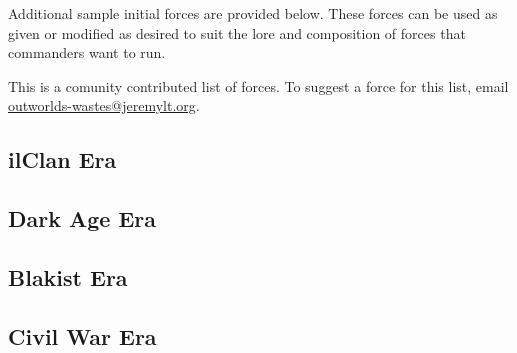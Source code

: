 Additional sample initial forces are provided below.
These forces can be used as given or modified as desired to suit the lore and composition of forces that commanders want to run.

This is a comunity contributed list of forces.
To suggest a force for this list, email \href{mailto:outworlds-wastes@jeremylt.org}{outworlds-wastes@jeremylt.org}.

\subsection{ilClan Era}





\subsection{Dark Age Era}



\subsection{Blakist Era}



\subsection{Civil War Era}







